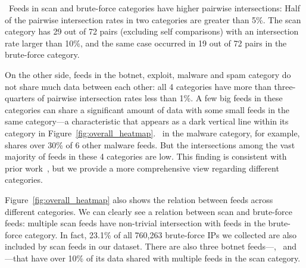 
\finding\ Feeds in scan and brute-force categories have higher pairwise intersections: Half of the pairwise intersection rates in two categories are greater than 5\%. The scan category has 29 out of 72 pairs (excluding self comparisons) with an intersection rate larger than 10\%, and the same case occurred in 19 out of 72 pairs in the brute-force category.

On the other side, feeds in the botnet, exploit, malware and spam category do not share much data between each other: all 4 categories have more than three-quarters of pairwise intersection rates less than 1\%. A few big feeds in these categories can share a significant amount of data with some small feeds in the same category---a characteristic that appears as a dark vertical line within its category in Figure~\ref{fig:overall_heatmap}. \feedetiprep\ in the malware category, for example, shares over 30\% of 6 other malware feeds. But the intersections among the vast majority of feeds in these 4 categories are low. This finding is consistent with prior work~\cite{metcalf2015blacklist,thomas2016abuse}, but we provide a more comprehensive view regarding different categories.

Figure~\ref{fig:overall_heatmap} also shows the relation between feeds across different categories. We can clearly see a relation between scan and brute-force feeds: multiple scan feeds have non-trivial intersection with feeds in the brute-force category. In fact, 23.1\% of all 760,263 brute-force IPs we collected are also included by scan feeds in our dataset. There are also three botnet feeds---\feedTSCI, \feedTSVoIP\ and \feedTSCompr---that have over 10\% of its data shared with multiple feeds in the scan category.

